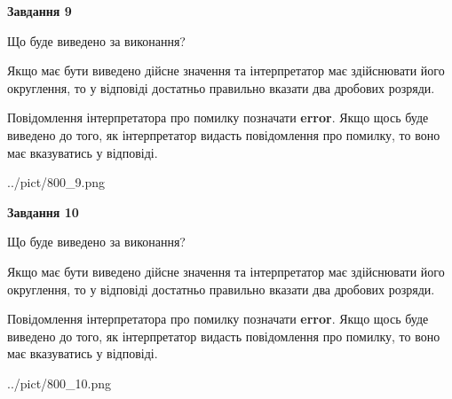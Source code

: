 \documentclass[12pt, ukrainian]{article}
\begin{document}
{\begin {Large}
{\begin {center}\textbf{Завдання 9}\end {center}}\par
Що буде виведено за виконання? \par

Якщо має бути виведено дійсне значення та інтерпретатор має здійснювати його округлення, 
то у відповіді достатньо правильно вказати два дробових розряди.

Повідомлення інтерпретатора про помилку позначати \textbf{error}.
Якщо щось буде виведено до того, як інтерпретатор видасть повідомлення про помилку, 
то воно має вказуватись у відповіді. \par

\begin{center}
	{../pict/800_9.png}
\end{center}
\newpage

{\begin {center}\textbf{Завдання 10}\end {center}}\par
Що буде виведено за виконання? \par

Якщо має бути виведено дійсне значення та інтерпретатор має здійснювати його округлення, 
то у відповіді достатньо правильно вказати два дробових розряди.

Повідомлення інтерпретатора про помилку позначати \textbf{error}.
Якщо щось буде виведено до того, як інтерпретатор видасть повідомлення про помилку, 
то воно має вказуватись у відповіді. \par

\begin{center}
	{../pict/800_10.png}
\end{center}
\newpage

\end {Large}}
\end{document}
